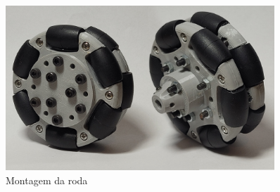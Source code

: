 \begin{figure}[h]
	\centering
	\caption{Montagem da roda}
	\label{wheel_assembling}
	\includegraphics[width=0.9\textwidth]{figures/roda_processo_desing_passo4}
\end{figure}